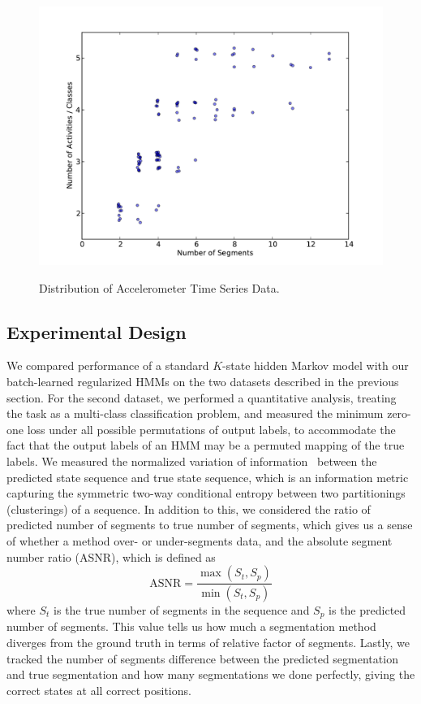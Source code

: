 \documentclass[letterpaper]{article}
\begin{document}
\begin{figure}[htbp]
    \caption{Distribution of Accelerometer Time Series Data.}
  \centering
    \includegraphics[width=1.\linewidth]{images/distribution_of_dataset_segments.pdf}
    \label{fig:distribution}
\end{figure}

\subsection{Experimental Design}

We compared performance of a standard $K$-state hidden Markov model with our batch-learned regularized HMMs on the two datasets described in the previous section. For the second dataset, we performed a quantitative analysis, treating the task as a multi-class classification problem, and measured the minimum zero-one loss under all possible permutations of output labels, to accommodate the fact that the output labels of an HMM may be a permuted mapping of the true labels. We measured the normalized variation of information~\cite{meila} between the predicted state sequence and true state sequence, which is an information metric capturing the symmetric two-way conditional entropy between two partitionings (clusterings) of a sequence.  In addition to this, we considered the ratio of predicted number of segments to true number of segments, which gives us a sense of whether a method over- or under-segments data, and the absolute segment number ratio (ASNR), which is defined as
\[
    \text{ASNR} = \frac{\max(S_t, S_p)}{\min(S_t, S_p)}
\]
where $S_t$ is the true number of segments in the sequence and $S_p$ is the predicted number of segments. This value tells us how much a segmentation method diverges from the ground truth in terms of relative factor of segments. Lastly, we tracked the number of segments difference between the predicted segmentation and true segmentation and how many segmentations we done perfectly, giving the correct states at all correct positions.
\end{document}
